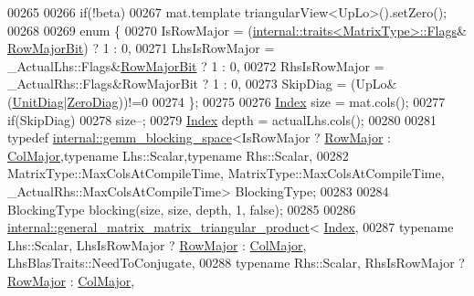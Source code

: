 \begin{DoxyCode}
00265 
00266     \textcolor{keywordflow}{if}(!beta)
00267       mat.template triangularView<UpLo>().setZero();
00268 
00269     \textcolor{keyword}{enum} \{
00270       IsRowMajor = (\hyperlink{struct_eigen_1_1internal_1_1traits}{internal::traits<MatrixType>::Flags}&
      \hyperlink{group__flags_gae4f56c2a60bbe4bd2e44c5b19cbe8762}{RowMajorBit}) ? 1 : 0,
00271       LhsIsRowMajor = \_ActualLhs::Flags&\hyperlink{group__flags_gae4f56c2a60bbe4bd2e44c5b19cbe8762}{RowMajorBit} ? 1 : 0,
00272       RhsIsRowMajor = \_ActualRhs::Flags&RowMajorBit ? 1 : 0,
00273       SkipDiag = (UpLo&(\hyperlink{group__enums_gga39e3366ff5554d731e7dc8bb642f83cdaddb72f888ac85d5a1c52333e54f9374b}{UnitDiag}|\hyperlink{group__enums_gga39e3366ff5554d731e7dc8bb642f83cda884ff7240392e85aa6e4b3c957e36483}{ZeroDiag}))!=0
00274     \};
00275 
00276     \hyperlink{namespace_eigen_a62e77e0933482dafde8fe197d9a2cfde}{Index} size = mat.cols();
00277     \textcolor{keywordflow}{if}(SkipDiag)
00278       size--;
00279     \hyperlink{namespace_eigen_a62e77e0933482dafde8fe197d9a2cfde}{Index} depth = actualLhs.cols();
00280 
00281     \textcolor{keyword}{typedef} \hyperlink{class_eigen_1_1internal_1_1gemm__blocking__space}{internal::gemm\_blocking\_space}<IsRowMajor ? 
      \hyperlink{group__enums_ggaacded1a18ae58b0f554751f6cdf9eb13acfcde9cd8677c5f7caf6bd603666aae3}{RowMajor} : \hyperlink{group__enums_ggaacded1a18ae58b0f554751f6cdf9eb13a0cbd4bdd0abcfc0224c5fcb5e4f6669a}{ColMajor},\textcolor{keyword}{typename} Lhs::Scalar,\textcolor{keyword}{typename} Rhs::Scalar,
00282           MatrixType::MaxColsAtCompileTime, MatrixType::MaxColsAtCompileTime, 
      \_ActualRhs::MaxColsAtCompileTime> BlockingType;
00283 
00284     BlockingType blocking(size, size, depth, 1, \textcolor{keyword}{false});
00285 
00286     \hyperlink{struct_eigen_1_1internal_1_1general__matrix__matrix__triangular__product}{internal::general\_matrix\_matrix\_triangular\_product}<
      \hyperlink{namespace_eigen_a62e77e0933482dafde8fe197d9a2cfde}{Index},
00287       \textcolor{keyword}{typename} Lhs::Scalar, LhsIsRowMajor ? \hyperlink{group__enums_ggaacded1a18ae58b0f554751f6cdf9eb13acfcde9cd8677c5f7caf6bd603666aae3}{RowMajor} : \hyperlink{group__enums_ggaacded1a18ae58b0f554751f6cdf9eb13a0cbd4bdd0abcfc0224c5fcb5e4f6669a}{ColMajor}, 
      LhsBlasTraits::NeedToConjugate,
00288       \textcolor{keyword}{typename} Rhs::Scalar, RhsIsRowMajor ? \hyperlink{group__enums_ggaacded1a18ae58b0f554751f6cdf9eb13acfcde9cd8677c5f7caf6bd603666aae3}{RowMajor} : \hyperlink{group__enums_ggaacded1a18ae58b0f554751f6cdf9eb13a0cbd4bdd0abcfc0224c5fcb5e4f6669a}{ColMajor}, 

\end{DoxyCode}
